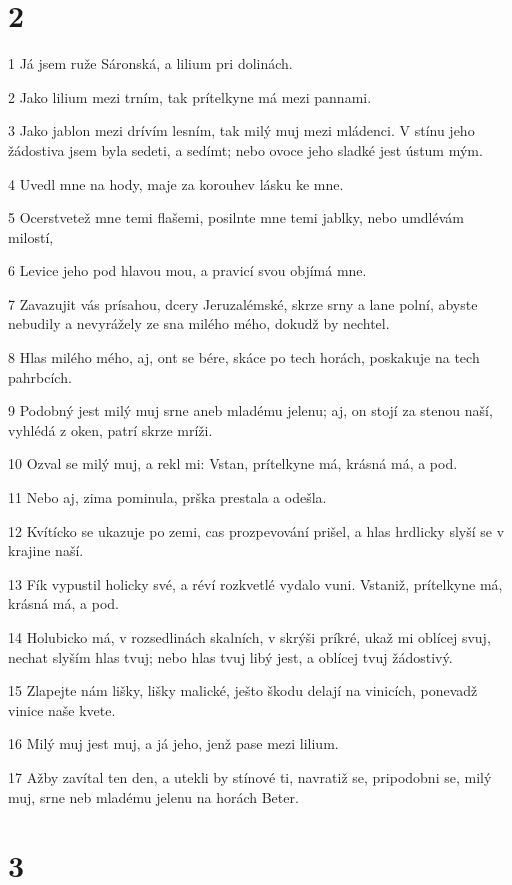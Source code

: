 \chapter{2}

\par 1 Já jsem ruže Sáronská, a lilium pri dolinách.
\par 2 Jako lilium mezi trním, tak prítelkyne má mezi pannami.
\par 3 Jako jablon mezi drívím lesním, tak milý muj mezi mládenci. V stínu jeho žádostiva jsem byla sedeti, a sedímt; nebo ovoce jeho sladké jest ústum mým.
\par 4 Uvedl mne na hody, maje za korouhev lásku ke mne.
\par 5 Ocerstvetež mne temi flašemi, posilnte mne temi jablky, nebo umdlévám milostí,
\par 6 Levice jeho pod hlavou mou, a pravicí svou objímá mne.
\par 7 Zavazujit vás prísahou, dcery Jeruzalémské, skrze srny a lane polní, abyste nebudily a nevyrážely ze sna milého mého, dokudž by nechtel.
\par 8 Hlas milého mého, aj, ont se bére, skáce po tech horách, poskakuje na tech pahrbcích.
\par 9 Podobný jest milý muj srne aneb mladému jelenu; aj, on stojí za stenou naší, vyhlédá z oken, patrí skrze mríži.
\par 10 Ozval se milý muj, a rekl mi: Vstan, prítelkyne má, krásná má, a pod.
\par 11 Nebo aj, zima pominula, prška prestala a odešla.
\par 12 Kvítícko se ukazuje po zemi, cas prozpevování prišel, a hlas hrdlicky slyší se v krajine naší.
\par 13 Fík vypustil holicky své, a réví rozkvetlé vydalo vuni. Vstaniž, prítelkyne má, krásná má, a pod.
\par 14 Holubicko má, v rozsedlinách skalních, v skrýši príkré, ukaž mi oblícej svuj, nechat slyším hlas tvuj; nebo hlas tvuj libý jest, a oblícej tvuj žádostivý.
\par 15 Zlapejte nám lišky, lišky malické, ješto škodu delají na vinicích, ponevadž vinice naše kvete.
\par 16 Milý muj jest muj, a já jeho, jenž pase mezi lilium.
\par 17 Ažby zavítal ten den, a utekli by stínové ti, navratiž se, pripodobni se, milý muj, srne neb mladému jelenu na horách Beter.

\chapter{3}

